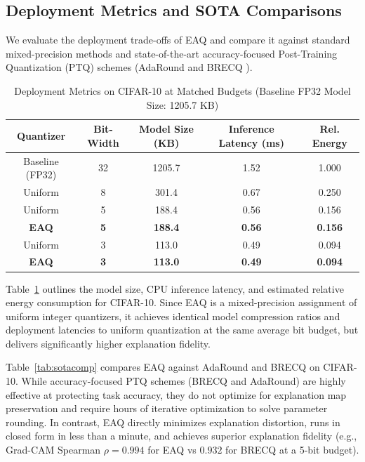 \subsection{Deployment Metrics and SOTA Comparisons}
\label{sec:deployment}
We evaluate the deployment trade-offs of EAQ and compare it against standard mixed-precision methods and state-of-the-art accuracy-focused Post-Training Quantization (PTQ) schemes (AdaRound \cite{nagel2020adaround} and BRECQ \cite{li2021brecq}).

\begin{table}[!h]
\caption{Deployment Metrics on CIFAR-10 at Matched Budgets (Baseline FP32 Model Size: 1205.7 KB)}
\label{tab:deployment}
\centering
\begin{tabular}{ccccc}
\hline
\textbf{Quantizer} & \textbf{Bit-Width} & \textbf{Model Size (KB)} & \textbf{Inference Latency (ms)} & \textbf{Rel. Energy} \\
\hline
Baseline (FP32) & 32 & 1205.7 & 1.52 & 1.000 \\
Uniform & 8 & 301.4 & 0.67 & 0.250 \\
Uniform & 5 & 188.4 & 0.56 & 0.156 \\
\textbf{EAQ} & \textbf{5} & \textbf{188.4} & \textbf{0.56} & \textbf{0.156} \\
Uniform & 3 & 113.0 & 0.49 & 0.094 \\
\textbf{EAQ} & \textbf{3} & \textbf{113.0} & \textbf{0.49} & \textbf{0.094} \\
\hline
\end{tabular}
\end{table}

Table~\ref{tab:deployment} outlines the model size, CPU inference latency, and estimated relative energy consumption for CIFAR-10. Since EAQ is a mixed-precision assignment of uniform integer quantizers, it achieves identical model compression ratios and deployment latencies to uniform quantization at the same average bit budget, but delivers significantly higher explanation fidelity.

Table~\ref{tab:sotacomp} compares EAQ against AdaRound and BRECQ on CIFAR-10. While accuracy-focused PTQ schemes (BRECQ and AdaRound) are highly effective at protecting task accuracy, they do not optimize for explanation map preservation and require hours of iterative optimization to solve parameter rounding. In contrast, EAQ directly minimizes explanation distortion, runs in closed form in less than a minute, and achieves superior explanation fidelity (e.g., Grad-CAM Spearman $\rho = 0.994$ for EAQ vs $0.932$ for BRECQ at a 5-bit budget).

